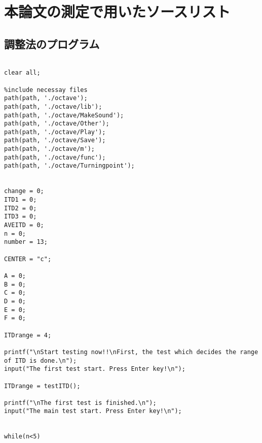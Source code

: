 ﻿\appendix
\chapter{本論文の測定で用いたソースリスト}
\section{調整法のプログラム}

\scriptsize{

\begin{verbatim}

clear all;

%include necessay files
path(path, './octave');
path(path, './octave/lib');
path(path, './octave/MakeSound');
path(path, './octave/Other');
path(path, './octave/Play');
path(path, './octave/Save');
path(path, './octave/m');
path(path, './octave/func');
path(path, './octave/Turningpoint');


change = 0;
ITD1 = 0;
ITD2 = 0;
ITD3 = 0;
AVEITD = 0;
n = 0;
number = 13;

CENTER = "c";

A = 0;
B = 0;
C = 0;
D = 0;
E = 0;
F = 0;

ITDrange = 4;

printf("\nStart testing now!!\nFirst, the test which decides the range of ITD is done.\n");
input("The first test start. Press Enter key!\n");

ITDrange = testITD();

printf("\nThe first test is finished.\n");
input("The main test start. Press Enter key!\n");


while(n<5)


\end{verbatim}}
